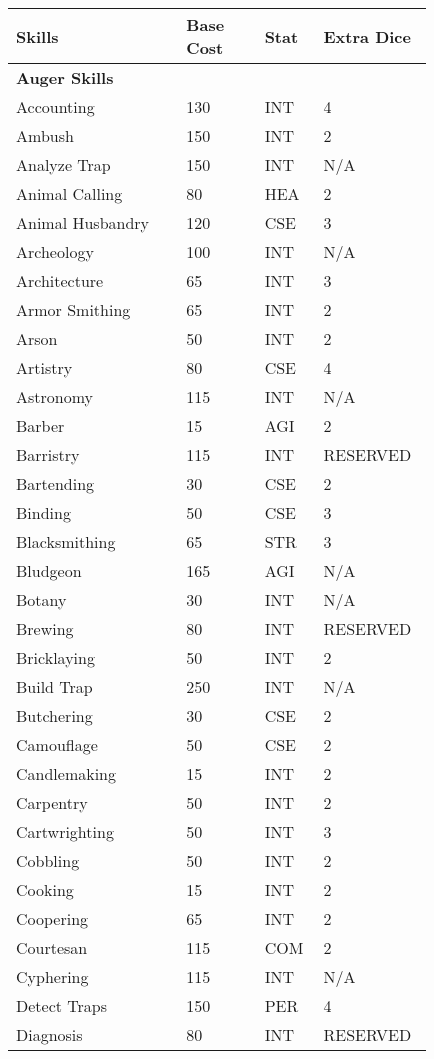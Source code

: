 \documentclass{article}
\begin{document}
\begin{longtable}{@{}p{0.375\linewidth} p{0.178\linewidth} p{0.1\linewidth} p{0.178\linewidth}}
\small
\textbf{Skills} & \textbf{Base Cost} & \textbf{Stat} & \textbf{Extra Dice}\\
\endhead
\textbf{Auger Skills} &  &  & \\
Accounting & 130 & INT & 4 \\
Ambush & 150 & INT & 2 \\
Analyze Trap & 150 & INT & N/A \\
Animal Calling & 80 & HEA & 2 \\
Animal Husbandry & 120 & CSE & 3 \\
Archeology & 100 & INT & N/A \\
Architecture & 65 & INT & 3 \\
Armor Smithing & 65 & INT & 2 \\
Arson & 50 & INT & 2 \\
Artistry & 80 & CSE & 4 \\
Astronomy & 115 & INT & N/A \\
Barber & 15 & AGI & 2 \\
Barristry & 115 & INT & RESERVED \\
Bartending & 30 & CSE & 2 \\
Binding & 50 & CSE & 3 \\
Blacksmithing & 65 & STR & 3 \\
Bludgeon & 165 & AGI & N/A \\
Botany & 30 & INT & N/A \\
Brewing & 80 & INT & RESERVED \\
Bricklaying & 50 & INT & 2 \\
Build Trap & 250 & INT & N/A \\
Butchering & 30 & CSE & 2 \\
Camouflage & 50 & CSE & 2 \\
Candlemaking & 15 & INT & 2 \\
Carpentry & 50 & INT & 2 \\
Cartwrighting & 50 & INT & 3 \\
Cobbling & 50 & INT & 2 \\
Cooking & 15 & INT & 2 \\
Coopering & 65 & INT & 2 \\
Courtesan & 115 & COM & 2 \\
Cyphering & 115 & INT & N/A \\
Detect Traps & 150 & PER & 4 \\
Diagnosis & 80 & INT & RESERVED \\

\end{longtable}
\end{document}
